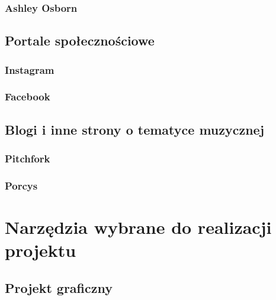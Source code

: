 \documentclass[12pt]{article}
\numberwithin{figure}{section}
\begin{document}
\begin{sloppypar}

\subsubsection{Ashley Osborn}


\subsection{Portale społecznościowe}


\subsubsection{Instagram}


\subsubsection{Facebook}


\subsection{Blogi i inne strony o tematyce muzycznej}


\subsubsection{Pitchfork}


\subsubsection{Porcys}


\newpage 

\section{Narzędzia wybrane do realizacji projektu}


\subsection{Projekt graficzny}


\end{sloppypar}
\end{document}
